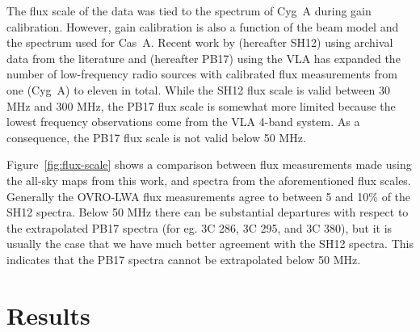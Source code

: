 \documentclass[twocolumn]{aastex61}
\begin{document}
The flux scale of the data was tied to the \citet{1977A&A....61...99B} spectrum of Cyg~A during gain
calibration. However, gain calibration is also a function of the beam model and the spectrum used
for Cas~A. Recent work by \citet{2012MNRAS.423L..30S} (hereafter SH12) using archival data from the
literature and \citet{2017ApJS..230....7P} (hereafter PB17) using the VLA has expanded the number of
low-frequency radio sources with calibrated flux measurements from one (Cyg~A) to eleven in total.
While the SH12 flux scale is valid between 30 MHz and 300 MHz, the PB17 flux scale is somewhat more
limited because the lowest frequency observations come from the VLA 4-band system. As a consequence,
the PB17 flux scale is not valid below 50 MHz.

Figure~\ref{fig:flux-scale} shows a comparison between flux measurements made using the all-sky maps
from this work, and spectra from the aforementioned flux scales. Generally the OVRO-LWA flux
measurements agree to between 5 and 10\% of the SH12 spectra. Below 50 MHz there can be substantial
departures with respect to the extrapolated PB17 spectra (for eg.  3C 286, 3C 295, and 3C 380), but
it is usually the case that we have much better agreement with the SH12 spectra. This indicates that
the PB17 spectra cannot be extrapolated below 50 MHz.

\section{Results}\label{sec:results}
\end{document}
